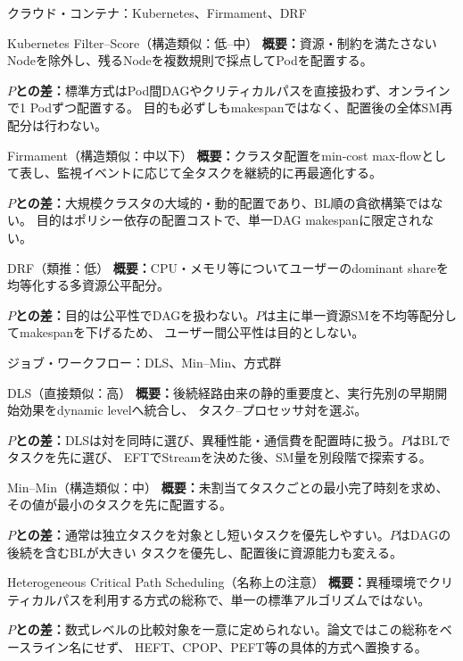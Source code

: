 \documentclass[aspectratio=169,10pt]{beamer}
\begin{document}
\begin{frame}{クラウド・コンテナ：Kubernetes、Firmament、DRF}
  \scriptsize
  \begin{block}{Kubernetes Filter--Score（構造類似：低--中）}
    \textbf{概要：}資源・制約を満たさないNodeを除外し、残るNodeを複数規則で採点してPodを配置する。\par
    \textbf{$P$との差：}標準方式はPod間DAGやクリティカルパスを直接扱わず、オンラインで1 Podずつ配置する。
    目的も必ずしもmakespanではなく、配置後の全体SM再配分は行わない。
  \end{block}
  \begin{block}{Firmament（構造類似：中以下）}
    \textbf{概要：}クラスタ配置をmin-cost max-flowとして表し、監視イベントに応じて全タスクを継続的に再最適化する。\par
    \textbf{$P$との差：}大規模クラスタの大域的・動的配置であり、BL順の貪欲構築ではない。
    目的はポリシー依存の配置コストで、単一DAG makespanに限定されない。
  \end{block}
  \begin{block}{DRF（類推：低）}
    \textbf{概要：}CPU・メモリ等についてユーザーのdominant shareを均等化する多資源公平配分。\par
    \textbf{$P$との差：}目的は公平性でDAGを扱わない。$P$は主に単一資源SMを不均等配分してmakespanを下げるため、
    ユーザー間公平性は目的としない。
  \end{block}
\end{frame}

\begin{frame}{ジョブ・ワークフロー：DLS、Min--Min、方式群}
  \scriptsize
  \begin{block}{DLS（直接類似：高）}
    \textbf{概要：}後続経路由来の静的重要度と、実行先別の早期開始効果をdynamic levelへ統合し、
    タスク--プロセッサ対を選ぶ。\par
    \textbf{$P$との差：}DLSは対を同時に選び、異種性能・通信費を配置時に扱う。$P$はBLでタスクを先に選び、
    EFTでStreamを決めた後、SM量を別段階で探索する。
  \end{block}
  \begin{block}{Min--Min（構造類似：中）}
    \textbf{概要：}未割当てタスクごとの最小完了時刻を求め、その値が最小のタスクを先に配置する。\par
    \textbf{$P$との差：}通常は独立タスクを対象とし短いタスクを優先しやすい。$P$はDAGの後続を含むBLが大きい
    タスクを優先し、配置後に資源能力も変える。
  \end{block}
  \begin{block}{Heterogeneous Critical Path Scheduling（名称上の注意）}
    \textbf{概要：}異種環境でクリティカルパスを利用する方式の総称で、単一の標準アルゴリズムではない。\par
    \textbf{$P$との差：}数式レベルの比較対象を一意に定められない。論文ではこの総称をベースライン名にせず、
    HEFT、CPOP、PEFT等の具体的方式へ置換する。
  \end{block}
\end{frame}
\end{document}
